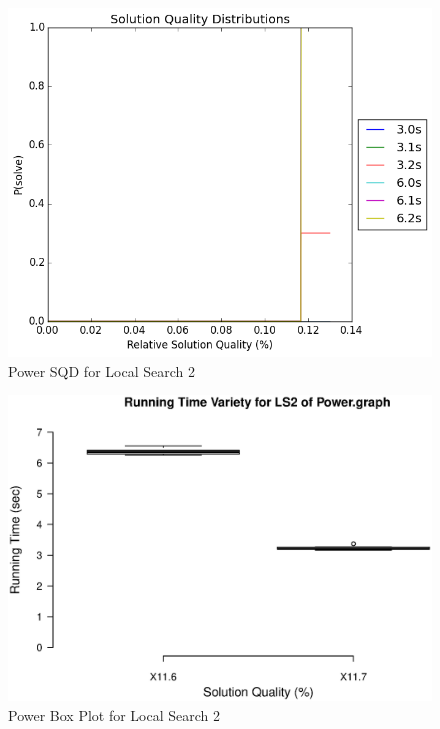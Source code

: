 \documentclass{sig-alternate-05-2015}
\begin{document}
\begin{figure}
\centering
\caption{Power SQD for Local Search 2}
\includegraphics[scale=0.4]{PowerLS2_sqd_graph.png}
\end{figure}

\begin{figure}
\centering
\caption{Power Box Plot for Local Search 2}
\includegraphics[scale=0.33]{PowerLS2_boxplot.eps}
\end{figure}
\end{document}
